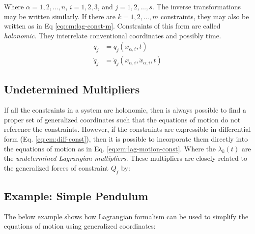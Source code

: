 Where $\alpha = 1, 2, ..., n$, $i = 1, 2, 3$, and $j = 1, 2, ..., s$. The inverse transformations may be written similarly. If there are $k = 1, 2, ..., m$ constraints, they may also be written as in Eq \ref{eq:cm:lag-const-m}. Constraints of this form are called \textit{holonomic}. They interrelate  conventional coordinates and possibly time.
\begin{equation}
\begin{split}
		q_{j} &= q_{j}(x_{\alpha, i}, t) \\
		\dot{q}_{j} &= \dot{q}_j(x_{\alpha, i}, \dot{x}_{\alpha, i}, t) 
\end{split}	
\end{equation}



\subsection{Undetermined Multipliers}
If all the constraints in a system are holonomic, then is always possible to find a proper set of generalized coordinates such that the equations of motion do not reference the constraints. However, if the constraints are expressible in differential form (Eq. \ref{eq:cm:diff-const}), then it is possible to incorporate them directly into the equations of motion as in Eq. \ref{eq:cm:lag-motion-const}.
Where the $\lambda_k(t)$ are the \textit{undetermined Lagrangian multipliers}. These multipliers are closely related to the generalized forces of constraint $Q_j$ by:


\subsection{Example: Simple Pendulum}
\label{sec:cm-lag-pend}
The below example shows how Lagrangian formalism can be used to simplify the equations of motion using generalized coordinates:





